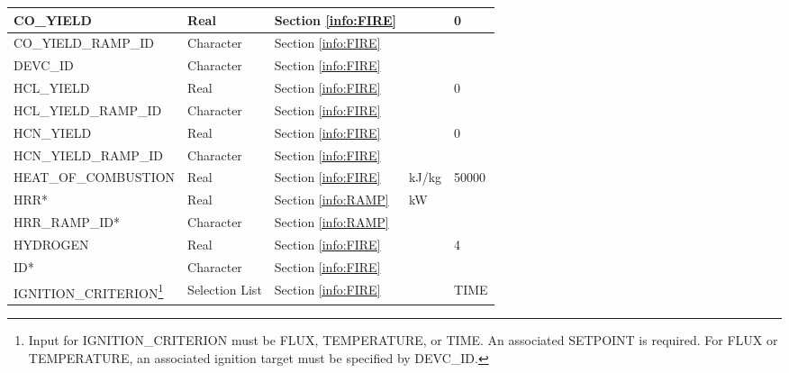 \begin{minipage}{6.5in}
\begin{longtable}{@{\extracolsep{\fill}}|l|l|l|l|l|}
{\ct CO\_YIELD}            & Real        & Section \ref{info:FIRE}                 &                             &  0               \\ \hline
{\ct CO\_YIELD\_RAMP\_ID}            & Character        & Section \ref{info:FIRE}                 &                             &                 \\ \hline
{\ct DEVC\_ID}             & Character   & Section \ref{info:FIRE}                 &                             &                 \\ \hline
{\ct HCL\_YIELD}           & Real   & Section \ref{info:FIRE}                 &                             &  0               \\ \hline
{\ct HCL\_YIELD\_RAMP\_ID}            & Character        & Section \ref{info:FIRE}                 &                             &                 \\ \hline
{\ct HCN\_YIELD}           & Real   & Section \ref{info:FIRE}                 &                             &  0               \\ \hline
{\ct HCN\_YIELD\_RAMP\_ID}            & Character        & Section \ref{info:FIRE}                 &                             &                 \\ \hline
{\ct HEAT\_OF\_COMBUSTION} & Real        & Section \ref{info:FIRE}                 & kJ/kg                       &     50000       \\ \hline
{\ct HRR}*        & Real   &  Section \ref{info:RAMP}                &  kW                           &                 \\ \hline
{\ct HRR\_RAMP\_ID}*        & Character   &  Section \ref{info:RAMP}                &                             &                 \\ \hline
{\ct HYDROGEN}             & Real     & Section \ref{info:FIRE}                 &                             &  4               \\ \hline
{\ct ID}*                   & Character   & Section \ref{info:FIRE}                 &                             &                 \\ \hline
{\ct IGNITION\_CRITERION}\footnote{Input for {\ct IGNITION\_CRITERION} must be {\ct FLUX}, {\ct TEMPERATURE}, or {\ct TIME}. An associated {\ct SETPOINT} is required. For {\ct FLUX} or {\ct TEMPERATURE}, an associated ignition target must be specified by {\ct DEVC\_ID}.}
                           & Selection List   & Section \ref{info:FIRE}                 &                             & TIME                \\ \hline

\end{longtable}
\end{minipage}
